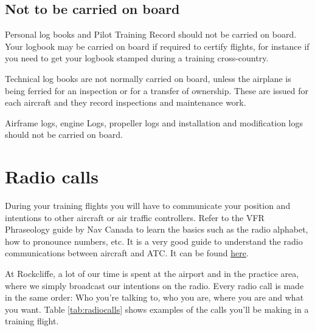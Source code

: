 \documentclass[12pt,letterpaper]{article}
\begin{document}
    \subsection{Not to be carried on board}
    
    Personal log books and Pilot Training Record should not be carried on board. Your logbook may be carried on board if required to certify flights, for instance if you need to get your logbook stamped during a training cross-country.
    
    Technical log books are not normally carried on board, unless the airplane is being ferried for an inspection or for a transfer of ownership. These are issued for each aircraft and they record inspections and maintenance work.  
    
    Airframe logs, engine Logs, propeller logs and installation and modification logs should not be carried on board.
    
    \section{Radio calls}
    During your training flights you will have to communicate your position and intentions to other aircraft or air traffic controllers. Refer to the VFR Phraseology guide by Nav Canada to learn the basics such as the radio alphabet, how to pronounce numbers, etc. It is a very good guide to understand the radio communications between aircraft and ATC. It can be found \href{https://www.navcanada.ca/en/vfr-phraseology.pdf}{\color{cyan}here}.
    
    At Rockcliffe, a lot of our time is spent at the airport and in the practice area, where we simply broadcast our intentions on the radio. Every radio call is made in the same order: Who you’re talking to, who you are, where you are and what you want. Table \ref{tab:radiocalls} shows examples of the calls you’ll be making in a training flight.
    
\end{document}
